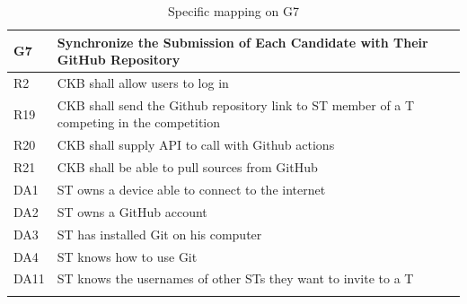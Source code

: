   \begin{longtable}{|l|p{12cm}|}
    \hline
    \textbf{G7} & \textbf{Synchronize the Submission of Each Candidate with Their GitHub Repository}      \\
    \hline
    R2 & CKB shall allow users to log in \\
    \hline
    R19 & CKB shall send the Github repository link to ST member of a T competing in the competition \\
    \hline
    R20 & CKB shall supply API to call with Github actions \\
    \hline
    R21 & CKB shall be able to pull sources from GitHub \\
    \hline
    DA1 & ST owns a device able to connect to the internet \\
    \hline
    DA2 & ST owns a GitHub account \\
    \hline
    DA3 & ST has installed Git on his computer \\
    \hline
    DA4 & ST knows how to use Git \\
    \hline
    DA11 & ST knows the usernames of other STs they want to invite to a T \\
    \hline

    \caption{Specific mapping on G7}
    \label{tab:mappingG7}
  \end{longtable}


